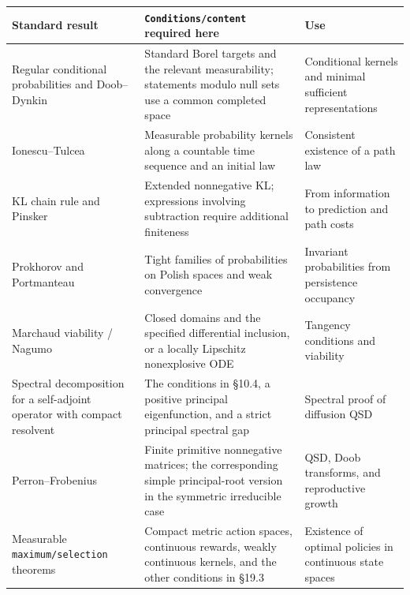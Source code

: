 \documentclass[
  english,
  11pt,
  oneside]{book}
\newcounter{none} %
\begin{document}
{\def\LTcaptype{none} %
\begin{longtable}[]{@{}
  >{\raggedright\arraybackslash}p{}
  >{\raggedright\arraybackslash}p{}
  >{\raggedright\arraybackslash}p{}@{}}
\toprule\noalign{}
\begin{minipage}[b]{\linewidth}\raggedright
Standard result
\end{minipage} & \begin{minipage}[b]{\linewidth}\raggedright
\nolinkurl{Conditions/content} required here
\end{minipage} & \begin{minipage}[b]{\linewidth}\raggedright
Use
\end{minipage} \\
\midrule\noalign{}
\endhead
\bottomrule\noalign{}
\endlastfoot
Regular conditional probabilities and Doob--Dynkin & Standard Borel targets and the relevant measurability; statements modulo null sets use a common completed space & Conditional kernels and minimal sufficient representations \\
Ionescu--Tulcea & Measurable probability kernels along a countable time sequence and an initial law & Consistent existence of a path law \\
KL chain rule and Pinsker & Extended nonnegative KL; expressions involving subtraction require additional finiteness & From information to prediction and path costs \\
Prokhorov and Portmanteau & Tight families of probabilities on Polish spaces and weak convergence & Invariant probabilities from persistence occupancy \\
Marchaud viability / Nagumo & Closed domains and the specified differential inclusion, or a locally Lipschitz nonexplosive ODE & Tangency conditions and viability \\
Spectral decomposition for a self-adjoint operator with compact resolvent & The conditions in §10.4, a positive principal eigenfunction, and a strict principal spectral gap & Spectral proof of diffusion QSD \\
Perron--Frobenius & Finite primitive nonnegative matrices; the corresponding simple principal-root version in the symmetric irreducible case & QSD, Doob transforms, and reproductive growth \\
Measurable \nolinkurl{maximum/selection} theorems & Compact metric action spaces, continuous rewards, weakly continuous kernels, and the other conditions in §19.3 & Existence of optimal policies in continuous state spaces \\

\end{longtable}}
\end{document}
